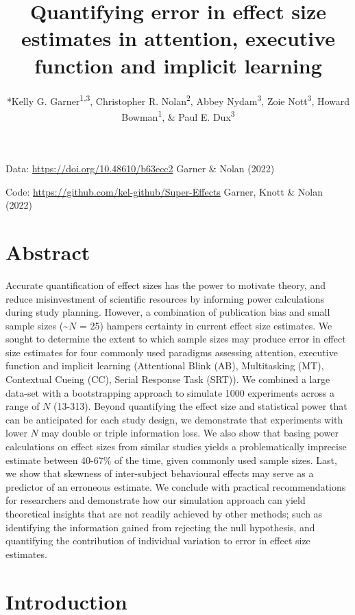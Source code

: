 \documentclass[
  man]{apa6}
\title{Quantifying error in effect size estimates in attention, executive function and implicit learning}
\author{*Kelly G. Garner\textsuperscript{1,3}, Christopher R. Nolan\textsuperscript{2}, Abbey Nydam\textsuperscript{3}, Zoie Nott\textsuperscript{3}, Howard Bowman\textsuperscript{1}, \& Paul E. Dux\textsuperscript{3}}
\date{}
\affiliation{\vspace{0.5cm}\textsuperscript{1} School of Psychology, University of Birmingham, UK\\\textsuperscript{2} School of Psychology, University of New South Wales, Australia\\\textsuperscript{3} School of Psychology, The University of Queensland, Australia}
\begin{document}
\maketitle

Data: \url{https://doi.org/10.48610/b63ecc2} Garner \& Nolan (2022)

Code: \url{https://github.com/kel-github/Super-Effects} Garner, Knott \& Nolan (2022)

\clearpage

\hypertarget{abstract}{%
\section{Abstract}\label{abstract}}

Accurate quantification of effect sizes has the power to motivate theory, and reduce misinvestment of scientific resources by informing power calculations during study planning. However, a combination of publication bias and small sample sizes (\textasciitilde{}\(N\) = 25) hampers certainty in current effect size estimates. We sought to determine the extent to which sample sizes may produce error in effect size estimates for four commonly used paradigms assessing attention, executive function and implicit learning (Attentional Blink (AB), Multitasking (MT), Contextual Cueing (CC), Serial Response Task (SRT)). We combined a large data-set with a bootstrapping approach to simulate 1000 experiments across a range of \(N\) (13-313). Beyond quantifying the effect size and statistical power that can be anticipated for each study design, we demonstrate that experiments with lower \(N\) may double or triple information loss. We also show that basing power calculations on effect sizes from similar studies yields a problematically imprecise estimate between 40-67\% of the time, given commonly used sample sizes. Last, we show that skewness of inter-subject behavioural effects may serve as a predictor of an erroneous estimate. We conclude with practical recommendations for researchers and demonstrate how our simulation approach can yield theoretical insights that are not readily achieved by other methods; such as identifying the information gained from rejecting the null hypothesis, and quantifying the contribution of individual variation to error in effect size estimates.

\clearpage

\hypertarget{introduction}{%
\section{Introduction}\label{introduction}}
\end{document}
